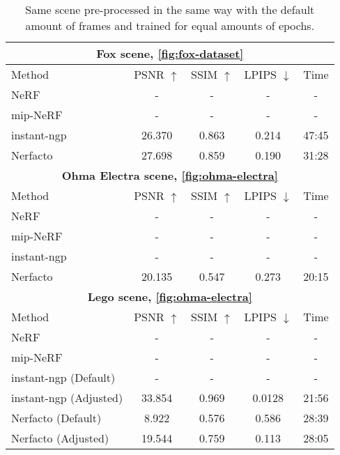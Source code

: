 \begin{table}[h]
\centering
\begin{tabular}{|lcccc|}
\hline
\multicolumn{5}{|c|}{\textbf{Fox scene, \autoref{fig:fox-dataset}}} \\ 
\hline
Method  & PSNR $\uparrow$ & SSIM $\uparrow$ & LPIPS $\downarrow$& Time  \\ 
\hline
NeRF        & -    & -     & -    & -    \\
mip-NeRF    & -    & -     & -    & -    \\
instant-ngp & 26.370    & 0.863     & 0.214    & 47:45    \\
Nerfacto    & 27.698    & 0.859     & 0.190    & 31:28    \\
\hline

\hline
\multicolumn{5}{|c|}{\textbf{Ohma Electra scene, \autoref{fig:ohma-electra}}} \\ 
\hline
Method  & PSNR $\uparrow$ & SSIM $\uparrow$ & LPIPS $\downarrow$& Time  \\ 
\hline
NeRF        & -    & -     & -    & -    \\
mip-NeRF    & -    & -     & -    & -    \\
instant-ngp & -    & -     & -    & -    \\
Nerfacto    & 20.135    & 0.547     & 0.273    & 20:15    \\ 
\hline

\hline
\multicolumn{5}{|c|}{\textbf{Lego scene, \autoref{fig:ohma-electra}}} \\ 
\hline
Method  & PSNR $\uparrow$ & SSIM $\uparrow$ & LPIPS $\downarrow$& Time  \\ 
\hline
NeRF        & -    & -     & -    & -    \\
mip-NeRF    & -    & -     & -    & -    \\
instant-ngp (Default)     & -    & -     & -    & -    \\
instant-ngp (Adjusted)     & 33.854    & 0.969     & 0.0128    & 21:56    \\
Nerfacto (Default)    & 8.922    & 0.576     & 0.586    & 28:39    \\ 
Nerfacto (Adjusted)    & 19.544    & 0.759     & 0.113    & 28:05    \\ 
\hline
\end{tabular}
\caption{Same scene pre-processed in the same way with the default amount of frames and trained for equal amounts of epochs.}
\label{tab:method-comparison}
\end{table}